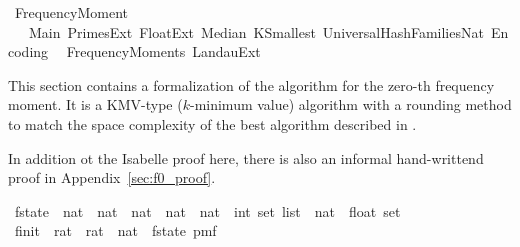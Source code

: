 %
\begin{isabellebody}%
%
%
\isadelimdocument
%
\endisadelimdocument
%
\isatagdocument
%
\isamarkuptrue%
%
\endisatagdocument
{\isafolddocument}%
%
\isadelimdocument
%
\endisadelimdocument
%
\isadelimtheory
%
\endisadelimtheory
%
\isatagtheory
{}\isamarkupfalse%
\ Frequency{\isacharunderscore}{\kern0pt}Moment{\isacharunderscore}{\kern0pt}{}\isanewline
\ \ \ Main\ Primes{\isacharunderscore}{\kern0pt}Ext\ Float{\isacharunderscore}{\kern0pt}Ext\ Median\ K{\isacharunderscore}{\kern0pt}Smallest\ Universal{\isacharunderscore}{\kern0pt}Hash{\isacharunderscore}{\kern0pt}Families{\isacharunderscore}{\kern0pt}Nat\ Encoding\isanewline
\ \ Frequency{\isacharunderscore}{\kern0pt}Moments\ Landau{\isacharunderscore}{\kern0pt}Ext\isanewline
{}%
\endisatagtheory
{\isafoldtheory}%
%
\isadelimtheory
%
\endisadelimtheory
%
\begin{isamarkuptext}%
This section contains a formalization of the algorithm for the zero-th frequency moment.
It is a KMV-type ($k$-minimum value) algorithm with a rounding method to match the space complexity 
of the best algorithm described in \cite{baryossef2002}.%
\end{isamarkuptext}\isamarkuptrue%
%
\begin{isamarkuptext}%
In addition ot the Isabelle proof here, there is also an informal hand-writtend proof in
Appendix~\ref{sec:f0_proof}.%
\end{isamarkuptext}\isamarkuptrue%
\isamarkupfalse%
\ f{}{\isacharunderscore}{\kern0pt}state\ {\isacharequal}{\kern0pt}\ {\isachardoublequoteopen}nat\ {\isasymtimes}\ nat\ {\isasymtimes}\ nat\ {\isasymtimes}\ nat\ {\isasymtimes}\ {\isacharparenleft}{\kern0pt}nat\ {\isasymRightarrow}\ {\isacharparenleft}{\kern0pt}int\ set\ list{\isacharparenright}{\kern0pt}{\isacharparenright}{\kern0pt}\ {\isasymtimes}\ {\isacharparenleft}{\kern0pt}nat\ {\isasymRightarrow}\ float\ set{\isacharparenright}{\kern0pt}{\isachardoublequoteclose}\isanewline
\isanewline
{}\isamarkupfalse%
\ f{}{\isacharunderscore}{\kern0pt}init\ {\isacharcolon}{\kern0pt}{\isacharcolon}{\kern0pt}\ {\isachardoublequoteopen}rat\ {\isasymRightarrow}\ rat\ {\isasymRightarrow}\ nat\ {\isasymRightarrow}\ f{}{\isacharunderscore}{\kern0pt}state\ pmf{\isachardoublequoteclose}\ \isanewline

\end{isabellebody}
